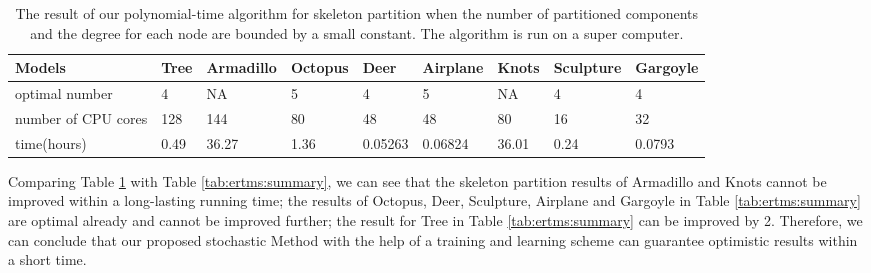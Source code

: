 \begin{table}[htb]

\begin{footnotesize}

\begin{center}

    \begin{tabular}{p{3.0cm} p{1.55cm} p{1.3cm} p{1.0cm} p{1.3cm} p{2.25cm} p{1.2cm} p{1.2cm}p{1.4cm}}

    \hline

     Models          & Tree           & Armadillo      & Octopus   & Deer      & Airplane      & Knots    &Sculpture  & Gargoyle\\ \hline
     optimal number   & 4             & NA              & 5         & 4         & 5             & NA      & 4         &4 \\ \hline
     number of CPU cores &128         & 144            & 80        & 48        &48             & 80       &16         &32 \\ \hline
     time(hours)     &0.49            & 36.27          & 1.36      &0.05263   &0.06824        & 36.01    &0.24       &0.0793 \\ \hline

    \end{tabular}

\end{center}

\end{footnotesize}

\caption{The result of our polynomial-time algorithm for skeleton partition when the number of partitioned components and the degree for each node are bounded by a small constant. The algorithm is run on a super computer.}\label{tab:ertms:super}

\end{table}


Comparing Table \ref{tab:ertms:super} with Table \ref{tab:ertms:summary}, we can see that the skeleton partition results of Armadillo and Knots cannot be improved within a long-lasting running time; the results of Octopus, Deer, Sculpture, Airplane and Gargoyle in Table \ref{tab:ertms:summary} are optimal already and cannot be improved further; the result for Tree in Table \ref{tab:ertms:summary} can be improved by 2.
{ Therefore, we can conclude that our proposed stochastic Method with the help of a training and learning scheme can guarantee optimistic results within a short time.}



